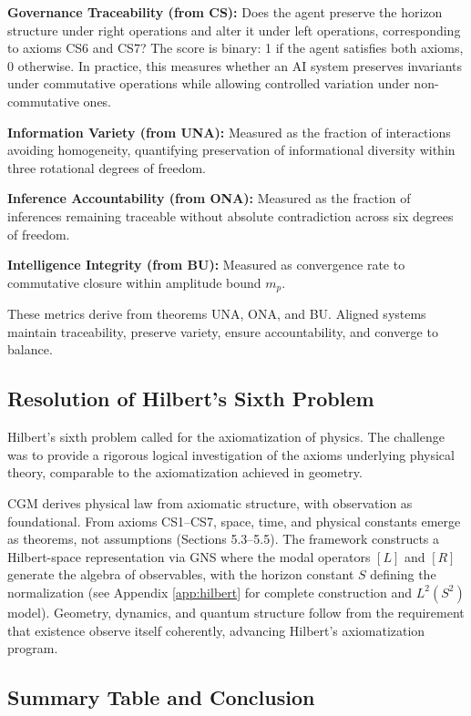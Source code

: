 \documentclass[11pt,a4paper]{article}
\theoremstyle{definition}
\theoremstyle{remark}
\begin{document}
\textbf{Governance Traceability (from CS):} Does the agent preserve the horizon structure under right operations and alter it under left operations, corresponding to axioms CS6 and CS7? The score is binary: 1 if the agent satisfies both axioms, 0 otherwise. In practice, this measures whether an AI system preserves invariants under commutative operations while allowing controlled variation under non-commutative ones.

\textbf{Information Variety (from UNA):} Measured as the fraction of interactions avoiding homogeneity, quantifying preservation of informational diversity within three rotational degrees of freedom.

\textbf{Inference Accountability (from ONA):} Measured as the fraction of inferences remaining traceable without absolute contradiction across six degrees of freedom.

\textbf{Intelligence Integrity (from BU):} Measured as convergence rate to commutative closure within amplitude bound $m_p$.

These metrics derive from theorems UNA, ONA, and BU. Aligned systems maintain traceability, preserve variety, ensure accountability, and converge to balance.

\subsection{Resolution of Hilbert's Sixth Problem}

Hilbert's sixth problem \cite{Hilbert1902} called for the axiomatization of physics. The challenge was to provide a rigorous logical investigation of the axioms underlying physical theory, comparable to the axiomatization achieved in geometry.

CGM derives physical law from axiomatic structure, with observation as foundational. From axioms CS1--CS7, space, time, and physical constants emerge as theorems, not assumptions (Sections 5.3--5.5). The framework constructs a Hilbert-space representation via GNS where the modal operators $[L]$ and $[R]$ generate the algebra of observables, with the horizon constant $S$ defining the normalization (see Appendix \ref{app:hilbert} for complete construction and $L^2(S^2)$ model). Geometry, dynamics, and quantum structure follow from the requirement that existence observe itself coherently, advancing Hilbert's axiomatization program.

\subsection{Summary Table and Conclusion}
\end{document}
